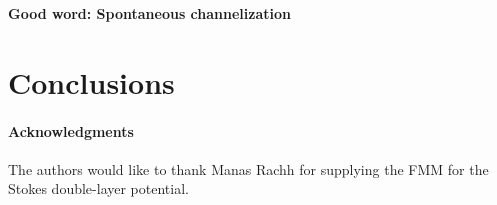 \documentclass[preprint, 10pt]{elsarticle}
\begin{document}
{\bf Good word: Spontaneous channelization}



\section{Conclusions\label{s:conclusions}}


\paragraph{\bf Acknowledgments} The authors would like to thank Manas
Rachh for supplying the FMM for the Stokes double-layer potential.



 

\end{document}

